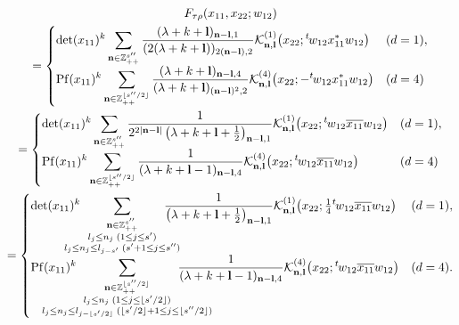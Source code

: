 \documentclass[pdftex]{sigma}
\numberwithin{equation}{section}
\newcommand{\bl}{\mathbf{l}}
\newcommand{\bn}{\mathbf{n}}
\newcommand{\BZ}{\mathbb{Z}}
\newcommand{\cK}{\mathcal{K}}
\newcommand{\Pf}{\operatorname{Pf}}
\begin{document}
\begin{gather*}
 F_{\tau\rho}(x_{11},x_{22};w_{12})\\
 =\begin{cases}\displaystyle \det(x_{11})^k\sum_{\bn\in\BZ_{++}^{s''}}
\frac{(\lambda+k+\bl)_{\bn-\bl,1}}{(2(\lambda+k+\bl))_{2(\bn-\bl),2}}\cK_{\bn,\bl}^{(1)}\big(x_{22};{}^t\hspace{-1pt}w_{12}x_{11}^*w_{12}\big)&
 (d=1),\\
\displaystyle \Pf(x_{11})^k\sum_{\bn\in\BZ_{++}^{\lfloor s''/2\rfloor}}
\frac{(\lambda+k+\bl)_{\bn-\bl,4}}{(\lambda+k+\bl)_{(\bn-\bl)^2,2}}\cK_{\bn,\bl}^{(4)}\big(x_{22};-{}^t\hspace{-1pt}w_{12}x_{11}^*w_{12}\big)
&(d=4)\end{cases}\\
 =\begin{cases}\displaystyle \det(x_{11})^k\sum_{\bn\in\BZ_{++}^{s''}}
\frac{1}{2^{2|\bn-\bl|}\left(\lambda+k+\bl+\frac{1}{2}\right)_{\bn-\bl,1}}
\cK_{\bn,\bl}^{(1)}\big(x_{22};{}^t\hspace{-1pt}w_{12}\overline{x_{11}}w_{12}\big)
&(d=1),\\
\displaystyle \Pf(x_{11})^k\sum_{\bn\in\BZ_{++}^{\lfloor s''/2\rfloor}}
\frac{1}{(\lambda+k+\bl-1)_{\bn-\bl,4}}\cK_{\bn,\bl}^{(4)}\big(x_{22};{}^t\hspace{-1pt}w_{12}\overline{x_{11}}w_{12}\big)
&(d=4)\end{cases}\\
 =\begin{cases}\displaystyle \det(x_{11})^k\hspace{-15pt}\sum_{\substack{\bn\in\BZ_{++}^{s''}\\ l_j\le n_j\; (1\le j\le s') \\
l_j\le n_j\le l_{j-s'}\; (s'+1\le j\le s'')}}\hspace{-15pt}
\frac{1}{\left(\lambda+k+\bl+\frac{1}{2}\right)_{\bn-\bl,1}}
\cK_{\bn,\bl}^{(1)}\big(x_{22};\tfrac{1}{4}{}^t\hspace{-1pt}w_{12}\overline{x_{11}}w_{12}\big)&(d=1),\\
\displaystyle \Pf(x_{11})^k\hspace{-30pt}\sum_{\substack{\bn\in\BZ_{++}^{\lfloor s''/2\rfloor}\\ l_j\le n_j\; (1\le j\le \lfloor s'/2\rfloor) \\
l_j\le n_j\le l_{j-\lfloor s'/2\rfloor}\; (\lfloor s'/2\rfloor+1\le j\le \lfloor s''/2\rfloor)}}\hspace{-30pt}
\frac{1}{(\lambda+k+\bl-1)_{\bn-\bl,4}}\cK_{\bn,\bl}^{(4)}\big(x_{22};{}^t\hspace{-1pt}w_{12}\overline{x_{11}}w_{12}\big)
&(d=4).\end{cases}
\end{gather*}
\end{document}
